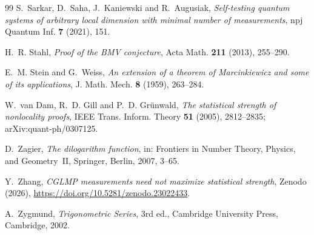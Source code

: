 \documentclass[11pt]{amsart}
\theoremstyle{definition}
\theoremstyle{remark}
\numberwithin{equation}{section}
\begin{document}
\begin{thebibliography}{99}
S.~Sarkar, D.~Saha, J.~Kaniewski and R.~Augusiak, \emph{Self-testing quantum systems of arbitrary local dimension with
minimal number of measurements}, npj Quantum Inf. \textbf{7} (2021), 151.

H.~R. Stahl, \emph{Proof of the BMV conjecture}, Acta Math. \textbf{211} (2013), 255--290.

E.~M. Stein and G.~Weiss, \emph{An extension of a theorem of Marcinkiewicz and some of its applications}, J. Math. Mech.
\textbf{8} (1959), 263--284.

W.~van Dam, R.~D. Gill and P.~D. Gr\"unwald, \emph{The statistical strength of nonlocality proofs}, IEEE Trans. Inform.
Theory \textbf{51} (2005), 2812--2835; arXiv:quant-ph/0307125.

D.~Zagier, \emph{The dilogarithm function}, in: Frontiers in Number Theory, Physics, and Geometry~II, Springer, Berlin,
2007, 3--65.

Y.~Zhang, \emph{CGLMP measurements need not maximize statistical strength}, Zenodo (2026),
\url{https://doi.org/10.5281/zenodo.23022433}.

A.~Zygmund, \emph{Trigonometric Series}, 3rd ed., Cambridge University Press, Cambridge, 2002.

\end{thebibliography}
\end{document}
